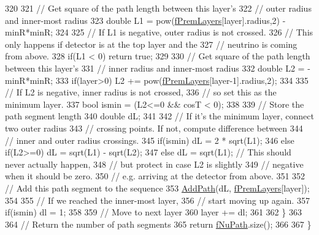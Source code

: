 \begin{DoxyCode}
320   
321     \textcolor{comment}{// Get square of the path length between this layer's }
322     \textcolor{comment}{// outer radius and  inner-most radius}
323     \textcolor{keywordtype}{double} L1 = pow(\hyperlink{classOscProb_1_1PremModel_ac33265ceae42c59a5e11ca416eff93b0}{fPremLayers}[layer].radius,2) - minR*minR;
324 
325     \textcolor{comment}{// If L1 is negative, outer radius is not crossed.}
326     \textcolor{comment}{// This only happens if detector is at the top layer and the}
327     \textcolor{comment}{// neutrino is coming from above.}
328     \textcolor{keywordflow}{if}(L1 < 0) \textcolor{keywordflow}{return} \textcolor{keyword}{true};
329     
330     \textcolor{comment}{// Get square of the path length between this layer's }
331     \textcolor{comment}{// inner radius and  inner-most radius}
332     \textcolor{keywordtype}{double} L2 = -minR*minR;
333     \textcolor{keywordflow}{if}(layer>0) L2 += pow(\hyperlink{classOscProb_1_1PremModel_ac33265ceae42c59a5e11ca416eff93b0}{fPremLayers}[layer-1].radius,2);
334     
335     \textcolor{comment}{// If L2 is negative, inner radius is not crossed,}
336     \textcolor{comment}{// so set this as the minimum layer.}
337     \textcolor{keywordtype}{bool} ismin = (L2<=0 && cosT < 0);
338 
339     \textcolor{comment}{// Store the path segment length}
340     \textcolor{keywordtype}{double} dL;
341     
342     \textcolor{comment}{// If it's the minimum layer, connect two outer radius }
343     \textcolor{comment}{// crossing points. If not, compute difference between}
344     \textcolor{comment}{// inner and outer radius crossings.}
345     \textcolor{keywordflow}{if}(ismin)      dL = 2 * sqrt(L1);
346     \textcolor{keywordflow}{else} \textcolor{keywordflow}{if}(L2>=0) dL = sqrt(L1) - sqrt(L2);
347     \textcolor{keywordflow}{else}           dL = sqrt(L1); \textcolor{comment}{// This should never actually happen,}
348                                   \textcolor{comment}{// but protect in case L2 is slightly}
349                                   \textcolor{comment}{// negative when it should be zero.}
350                                   \textcolor{comment}{// e.g. arriving at the detector from above.}
351     
352     \textcolor{comment}{// Add this path segment to the sequence}
353     \hyperlink{classOscProb_1_1PremModel_aca013f7ac5494282834048786a0e07a6}{AddPath}(dL, \hyperlink{classOscProb_1_1PremModel_ac33265ceae42c59a5e11ca416eff93b0}{fPremLayers}[layer]);
354     
355     \textcolor{comment}{// If we reached the inner-most layer,}
356     \textcolor{comment}{// start moving up again.}
357     \textcolor{keywordflow}{if}(ismin) dl = 1;
358     
359     \textcolor{comment}{// Move to next layer}
360     layer += dl;
361   
362   \}
363 
364   \textcolor{comment}{// Return the number of path segments}
365   \textcolor{keywordflow}{return} \hyperlink{classOscProb_1_1PremModel_afb5674b8b06add6b981e557d7b07016c}{fNuPath}.size();
366 
367 \}
\end{DoxyCode}

